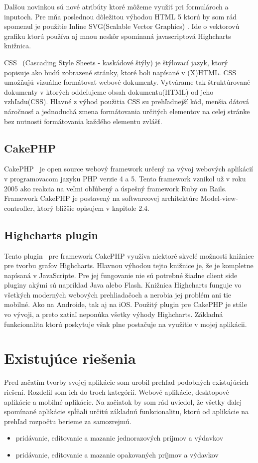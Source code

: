 \documentclass[12pt,onesided]{book}
\begin{document}
Dalšou novinkou sú nové atribúty ktoré môžeme využiť pri formulároch a inputoch. Pre mňa poslednou dôležitou výhodou HTML 5 ktorú by som rád spomenul je použitie Inline SVG(Scalable Vector Graphics) . Ide o vektorovú grafiku ktorú používa aj mnou neskôr spomínaná javascriptová Highcharts knižnica.

CSS \cite{CSS21}\ (Cascading Style Sheets - kaskádové štýly) je štýlovací jazyk, ktorý popisuje ako budú zobrazené stránky, ktoré boli napísané v (X)HTML. CSS umožňujú vizuálne formátovať webové dokumenty. Vytvárame tak štruktúrované dokumenty v ktorých oddeľujeme obsah dokumentu(HTML) od jeho vzhľadu(CSS). Hlavné z výhod použitia CSS su prehľadnejší kód, menšia dátová náročnosť a jednoduchá zmena formátovania určitých elementov na celej stránke bez nutnosti formátovania každého elementu zvlášť. 

\subsection{CakePHP} 
CakePHP \cite{CakePHP}\ je open source webový framework určený na vývoj webových aplikácií v programovacom jazyku PHP verzie 4 a 5. Tento framework vznikol už v roku 2005 ako reakcia na veľmi obľúbený a úspešný framework Ruby on Rails. Framework CakePHP je postavený na softwareovej architektúre Model-view-controller, ktorý bližšie opisujem v kapitole 2.4.


\subsection{Highcharts plugin} 
Tento plugin \cite{HighchartsPlugin}\ pre framework CakePHP využíva niektoré skvelé možnosti knižnice pre tvorbu grafov Highcharts. Hlavnou výhodou tejto knižnice je, že je kompletne napísaná v JavaScripte. Pre jej fungovanie nie sú potrebné žiadne client side pluginy akými sú napríklad Java alebo Flash. Knižnica Highcharts funguje vo všetkých moderných webových prehliadačoch a nerobia jej problém ani tie mobilné. Ako na Androide, tak aj na iOS. Použitý plugin pre CakePHP je stále vo vývoji, a preto zatiaľ neponúka všetky výhody Highcharts. Základná funkcionalita ktorú poskytuje však plne postačuje na využitie v mojej aplikácii.

\section{Existujúce riešenia}
Pred začatím tvorby svojej aplikácie som urobil prehľad podobných existujúcich riešení. Rozdelil som ich do troch kategórií. Webové aplikácie, desktopové aplikácie a mobilné aplikácie.
Na začiatok by som rád uviedol, že všetky ďalej spomínané aplikácie spĺňali určitú základnú funkcionalitu, ktorú od aplikácie na prehľad rozpočtu berieme za samozrejmú.
\begin{itemize}
\item{pridávanie, editovanie a mazanie jednorazových príjmov a výdavkov}
\item{pridávanie, editovanie a mazanie opakovaných príjmov a výdavkov}
\end{itemize}
\end{document}
